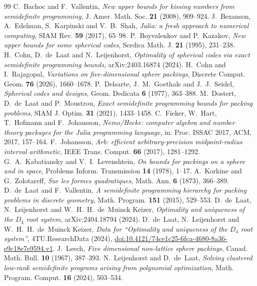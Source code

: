 \documentclass[11pt]{amsart}
\theoremstyle{remark}
\begin{document}
\begin{thebibliography}{99}
 C.~Bachoc and F.~Vallentin, \emph{New upper bounds for kissing numbers from semidefinite programming}, J. Amer. Math. Soc. \textbf{21} (2008), 909--924.
 J.~Bezanson, A.~Edelman, S.~Karpinski and V.~B.~Shah, \emph{Julia: a fresh approach to numerical computing}, SIAM Rev. \textbf{59} (2017), 65--98.
 P.~Boyvalenkov and P.~Kazakov, \emph{New upper bounds for some spherical codes}, Serdica Math. J. \textbf{21} (1995), 231--238.
 H.~Cohn, D.~de~Laat and N.~Leijenhorst, \emph{Optimality of spherical codes via exact semidefinite programming bounds}, arXiv:2403.16874 (2024).
 H.~Cohn and I.~Rajagopal, \emph{Variations on five-dimensional sphere packings}, Discrete Comput. Geom. \textbf{76} (2026), 1660--1678.
 P.~Delsarte, J.~M.~Goethals and J.~J.~Seidel, \emph{Spherical codes and designs}, Geom. Dedicata \textbf{6} (1977), 363--388.
 M.~Dostert, D.~de~Laat and P.~Moustrou, \emph{Exact semidefinite programming bounds for packing problems}, SIAM J. Optim. \textbf{31} (2021), 1433--1458.
 C.~Fieker, W.~Hart, T.~Hofmann and F.~Johansson, \emph{Nemo/Hecke: computer algebra and number theory packages for the Julia programming language}, in: Proc. ISSAC 2017, ACM, 2017, 157--164.
 F.~Johansson, \emph{Arb: efficient arbitrary-precision midpoint-radius interval arithmetic}, IEEE Trans. Comput. \textbf{66} (2017), 1281--1292.
 G.~A.~Kabatiansky and V.~I.~Levenshtein, \emph{On bounds for packings on a sphere and in space}, Problems Inform. Transmission \textbf{14} (1978), 1--17.
 A.~Korkine and G.~Zolotareff, \emph{Sur les formes quadratiques}, Math. Ann. \textbf{6} (1873), 366--389.
 D.~de~Laat and F.~Vallentin, \emph{A semidefinite programming hierarchy for packing problems in discrete geometry}, Math. Program. \textbf{151} (2015), 529--553.
 D.~de~Laat, N.~Leijenhorst and W.~H.~H.~de~Muinck Keizer, \emph{Optimality and uniqueness of the $D_4$ root system}, arXiv:2404.18794 (2024).
 D.~de~Laat, N.~Leijenhorst and W.~H.~H.~de~Muinck Keizer, \emph{Data for ``Optimality and uniqueness of the $D_4$ root system''}, 4TU.ResearchData (2024), \href{https://doi.org/10.4121/74ce1c25-6fca-4680-8a36-e9c18e7e9594.v1}{doi:10.4121/74ce1c25-6fca-4680-8a36-e9c18e7e9594.v1}.
 J.~Leech, \emph{Five dimensional non-lattice sphere packings}, Canad. Math. Bull. \textbf{10} (1967), 387--393.
 N.~Leijenhorst and D.~de~Laat, \emph{Solving clustered low-rank semidefinite programs arising from polynomial optimization}, Math. Program. Comput. \textbf{16} (2024), 503--534.

\end{thebibliography}
\end{document}
